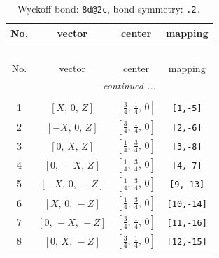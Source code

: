 \documentclass[fleqn,8pt]{jsarticle}
\begin{document}
\renewcommand{\arraystretch}{1.2}
\begin{longtable}{cccc}
\caption{Wyckoff bond: {\tt 8d@2c}, bond symmetry: {\tt .2.}}
 \\
 \hline \hline
No. & vector & center & mapping \\ \hline \endfirsthead

\multicolumn{3}{l}{\tablename\ \thetable{}} \\
 \hline \hline
No. & vector & center & mapping \\ \hline \endhead

 \hline \hline
\multicolumn{3}{r}{\footnotesize\it continued ...} \\ \endfoot

 \hline \hline
\multicolumn{3}{r}{} \\ \endlastfoot

1 & $\left[ X,\, 0,\, Z \right]$ & $\left[ \frac{3}{4},\, \frac{1}{4},\, 0 \right]$ & {\tt [1,-5]} \\ \hline
2 & $\left[ - X,\, 0,\, Z \right]$ & $\left[ \frac{3}{4},\, \frac{1}{4},\, 0 \right]$ & {\tt [2,-6]} \\ \hline
3 & $\left[ 0,\, X,\, Z \right]$ & $\left[ \frac{1}{4},\, \frac{3}{4},\, 0 \right]$ & {\tt [3,-8]} \\ \hline
4 & $\left[ 0,\, - X,\, Z \right]$ & $\left[ \frac{1}{4},\, \frac{3}{4},\, 0 \right]$ & {\tt [4,-7]} \\ \hline
5 & $\left[ - X,\, 0,\, - Z \right]$ & $\left[ \frac{1}{4},\, \frac{3}{4},\, 0 \right]$ & {\tt [9,-13]} \\ \hline
6 & $\left[ X,\, 0,\, - Z \right]$ & $\left[ \frac{1}{4},\, \frac{3}{4},\, 0 \right]$ & {\tt [10,-14]} \\ \hline
7 & $\left[ 0,\, - X,\, - Z \right]$ & $\left[ \frac{3}{4},\, \frac{1}{4},\, 0 \right]$ & {\tt [11,-16]} \\ \hline
8 & $\left[ 0,\, X,\, - Z \right]$ & $\left[ \frac{3}{4},\, \frac{1}{4},\, 0 \right]$ & {\tt [12,-15]} \\
\end{longtable}
\renewcommand{\arraystretch}{1.2}
\end{document}
